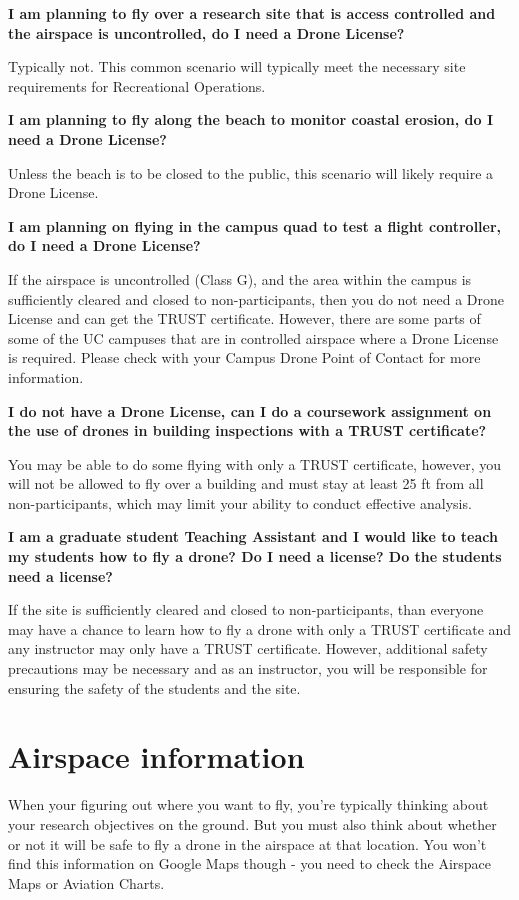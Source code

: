 \documentclass[
  12pt,
]{book}
\begin{document}
\textbf{I am planning to fly over a research site that is access controlled and the airspace is uncontrolled, do I need a Drone License?}

Typically not. This common scenario will typically meet the necessary site requirements for Recreational Operations.

\textbf{I am planning to fly along the beach to monitor coastal erosion, do I need a Drone License?}

Unless the beach is to be closed to the public, this scenario will likely require a Drone License.

\textbf{I am planning on flying in the campus quad to test a flight controller, do I need a Drone License?}

If the airspace is uncontrolled (Class G), and the area within the campus is sufficiently cleared and closed to non-participants, then you do not need a Drone License and can get the TRUST certificate. However, there are some parts of some of the UC campuses that are in controlled airspace where a Drone License is required. Please check with your Campus Drone Point of Contact for more information.

\textbf{I do not have a Drone License, can I do a coursework assignment on the use of drones in building inspections with a TRUST certificate?}

You may be able to do some flying with only a TRUST certificate, however, you will not be allowed to fly over a building and must stay at least 25 ft from all non-participants, which may limit your ability to conduct effective analysis.

\textbf{I am a graduate student Teaching Assistant and I would like to teach my students how to fly a drone? Do I need a license? Do the students need a license?}

If the site is sufficiently cleared and closed to non-participants, than everyone may have a chance to learn how to fly a drone with only a TRUST certificate and any instructor may only have a TRUST certificate. However, additional safety precautions may be necessary and as an instructor, you will be responsible for ensuring the safety of the students and the site.

\chapter{Airspace information}\label{airspace-info}

When your figuring out where you want to fly, you're typically thinking about your research objectives on the ground. But you must also think about whether or not it will be safe to fly a drone in the airspace at that location. You won't find this information on Google Maps though - you need to check the Airspace Maps or Aviation Charts.
\end{document}
